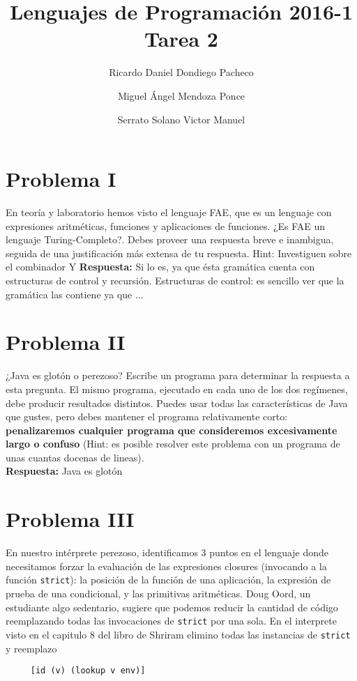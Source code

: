 \documentclass[12pt]{article}
\title{Lenguajes de Programación 2016-1\\Tarea 2}
\author{Ricardo Daniel Dondiego Pacheco \and  Miguel Ángel Mendoza Ponce \and Serrato Solano Victor Manuel}
\begin{document}
\maketitle
\section*{Problema I}
En teoría y laboratorio hemos visto el lenguaje FAE, que es un lenguaje
con expresiones aritméticas, funciones y aplicaciones de funciones.
¿Es FAE un lenguaje Turing-Completo?. Debes proveer una respuesta breve e inambigua, seguida de una justificación más extensa de tu respuesta.
Hint: Investiguen sobre el combinador Y
\textbf{Respuesta: }
Si lo es, ya que ésta gramática cuenta con estructuras de control y recursión.
Estructuras de control: es sencillo ver que la gramática las contiene ya que ...


\section*{Problema II}
¿Java es glotón o perezoso? Escribe un programa para determinar la respuesta a esta
pregunta. El mismo programa, ejecutado en cada uno de los dos regímenes, debe
producir resultados distintos. Puedes usar todas las características de Java
que gustes, pero debes mantener el programa relativamente corto:
\textbf{penalizaremos cualquier programa que consideremos excesivamente
  largo o confuso } (Hint: es posible resolver este problema con un programa
de unas cuantas docenas de lineas).
\\

\textbf{Respuesta: }
Java es glotón


\section*{Problema III}
En nuestro intérprete perezoso, identificamos 3 puntos en el lenguaje donde
necesitamos forzar la evaluación de las expresiones closures (invocando a la
función \texttt{strict}): la posición de la función de una aplicación,
la expresión de prueba de una condicional, y las primitivas aritméticas.
Doug Oord, un estudiante algo sedentario, sugiere que podemos reducir
la cantidad de código reemplazando todas las invocaciones de \texttt{strict}
por una sola. En el interprete visto en el capitulo 8 del libro de Shriram
elimino todas las instancias de \texttt{strict} y reemplazo
\begin{verbatim}
     [id (v) (lookup v env)]
\end{verbatim}
\end{document}
